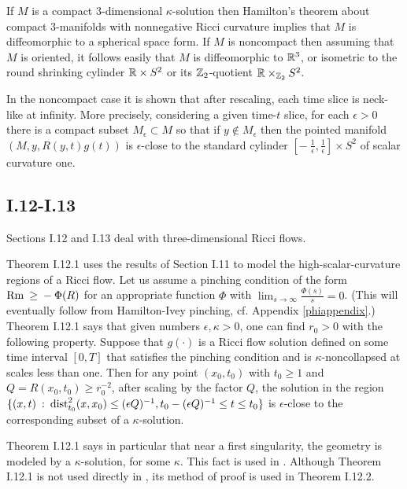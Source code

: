 If $M$ is a compact $3$-dimensional $\kappa$-solution
then Hamilton's theorem about
compact $3$-manifolds with nonnegative Ricci curvature implies that $M$
is diffeomorphic to a spherical space form. If $M$ is noncompact then assuming
that $M$ is oriented, it follows easily that $M$ is
diffeomorphic to ${\mathbb R}^3$, or isometric to the round shrinking cylinder ${\mathbb R} \times S^2$
or its ${\mathbb Z}_2$-quotient ${\mathbb R} \times_{{\mathbb Z}_2} S^2$.

In the noncompact case it is shown that after rescaling, each time slice is neck-like at
infinity.  More precisely, considering a given time-$t$ slice, for each $\epsilon > 0$
there is a compact subset $M_\epsilon \subset M$ so that if $y \notin M_\epsilon$
then the pointed manifold $(M, y, R(y,t) g(t))$ is $\epsilon$-close
to the standard cylinder $\left[ - \: \frac{1}{\epsilon}, \frac{1}{\epsilon} \right] \times
S^2$ of scalar curvature one.

\subsection{I.12-I.13}

Sections I.12 and I.13 deal with three-dimensional Ricci flows.

Theorem I.12.1 uses the results of Section I.11 to model the
high-scalar-curvature regions of a Ricci flow.
Let us assume a
pinching condition of the form $\operatorname{Rm} \: \ge \: - \: \Phi(R)$ for an
appropriate function $\Phi$ with $\lim_{s \rightarrow \infty}
\frac{\Phi(s)}{s} = 0$.
(This will eventually follow from Hamilton-Ivey pinching,
 cf. Appendix \ref{phiappendix}.)
Theorem I.12.1 says that given
numbers $\epsilon, \kappa > 0$, one can find $r_0 > 0$ with the
following property. Suppose that $g(\cdot)$ is a Ricci flow solution
defined on some time interval $[0, T]$ that satisfies the
pinching condition and is $\kappa$-noncollapsed at scales less than
one.   Then for any point $(x_0, t_0)$ with $t_0 \ge 1$ and
$Q = R(x_0, t_0) \ge r_0^{-2}$, after scaling by the factor $Q$, the
solution in the region $\{(x,t) \: : \: \operatorname{dist}_{t_0}^2(x, x_0) \le (\epsilon Q)^{-1},
t_0 - (\epsilon Q)^{-1} \le t \le t_0\}$ is $\epsilon$-close to the
corresponding subset of a $\kappa$-solution.

Theorem I.12.1 says in particular that near a first singularity, the geometry is modeled
by a $\kappa$-solution, for some $\kappa$. This fact is used in
\cite{Perelman2}. Although Theorem I.12.1 is not
used directly in \cite{Perelman}, its method of proof is used in Theorem I.12.2.

